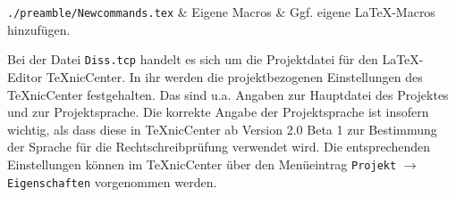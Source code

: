 \begin{table}[htbp]
\begin{tabularx}{\columnwidth}
\texttt{./preamble/Newcommands.tex}       & Eigene Macros
                                          & Ggf. eigene \LaTeX{}-Macros hinzufügen.\\
\bottomrule%
\end{tabularx}%
\caption[Dateien und Verzeichnisse der Vorlage]{Dateien und Verzeichnisse der Vorlage}%
\label{tab:StrukturDerVorlage}%
\end{table}

Bei der Datei \texttt{Diss.tcp} handelt es sich um die Projektdatei für den \LaTeX-Editor TeXnicCenter.
In ihr werden die projektbezogenen Einstellungen des TeXnicCenter festgehalten.
Das sind u.a. Angaben zur Hauptdatei des Projektes und zur Projektsprache.
Die korrekte Angabe der Projektsprache ist insofern wichtig, als dass diese in TeXnicCenter ab Version 2.0 Beta 1 zur Bestimmung der Sprache für die Rechtschreibprüfung verwendet wird.
Die entsprechenden Einstellungen können im TeXnicCenter über den Menüeintrag \texttt{Projekt} $\rightarrow$ \texttt{Eigenschaften} vorgenommen werden.


